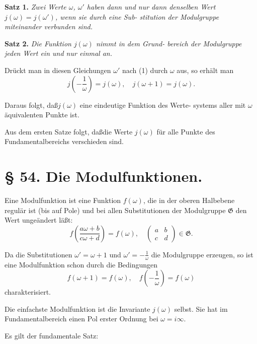 \documentclass[12pt,a4paper]{article}
\theoremstyle{definition}
\begin{document}
\textbf{Satz 1.} \textit{Zwei Werte $\omega$, $\omega'$ haben dann und nur
dann denselben Wert $j(\omega) = j(\omega')$, wenn sie durch eine Sub-
stitution der Modulgruppe miteinander verbunden sind.}

\textbf{Satz 2.} \textit{Die Funktion $j(\omega)$ nimmt in dem Grund-
bereich der Modulgruppe jeden Wert ein und nur einmal an.}

Dr\"{u}ckt man in diesen Gleichungen $\omega'$ nach (1) durch $\omega$ aus,
so erh\"{a}lt man
\begin{equation}\tag{3}
j\left(-\frac{1}{\omega}\right) = j(\omega), \quad j(\omega + 1) = j(\omega).
\end{equation}

Daraus folgt, da\ss $j(\omega)$ eine eindeutige Funktion des Werte-
systems aller mit $\omega$ \"{a}quivalenten Punkte ist.

Aus dem ersten Satze folgt, da\ss die Werte $j(\omega)$ f\"{u}r alle
Punkte des Fundamentalbereichs verschieden sind.

\section*{\S{} 54. Die Modulfunktionen.}

Eine Modulfunktion ist eine Funktion $f(\omega)$, die in der oberen
Halbebene regul\"{a}r ist (bis auf Pole) und bei allen Substitutionen
der Modulgruppe $\mathfrak{G}$ den Wert unge\"{a}ndert l\"{a}\ss t:
\begin{equation}\tag{1}
f\left(\frac{a\omega + b}{c\omega + d}\right) = f(\omega), \quad
\begin{pmatrix} a & b \\ c & d \end{pmatrix} \in \mathfrak{G}.
\end{equation}

Da die Substitutionen $\omega' = \omega + 1$ und $\omega' = -\frac{1}{\omega}$
die Modulgruppe erzeugen, so ist eine Modulfunktion schon
durch die Bedingungen
\begin{equation}\tag{2}
f(\omega + 1) = f(\omega), \quad f\left(-\frac{1}{\omega}\right) = f(\omega)
\end{equation}
charakterisiert.

Die einfachste Modulfunktion ist die Invariante $j(\omega)$ selbst.
Sie hat im Fundamentalbereich einen Pol erster Ordnung bei
$\omega = i\infty$.

Es gilt der fundamentale Satz:
\end{document}
